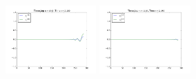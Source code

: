 \documentclass{article} %
\theoremstyle{plain}
\numberwithin{equation}{section} %
\numberwithin{figure}{section} %
\numberwithin{table}{section} %
\begin{document}
\begin{enumerate}[\ \ (a)]
\begin{figure}[ht!]
            \includegraphics[width=0.31\textwidth]{figures/problem_1_b_104.png}
            \includegraphics[width=0.31\textwidth]{figures/problem_1_b_111.png}
        \end{figure}
        \FloatBarrier
        \pagebreak


\end{enumerate}
\end{document}
